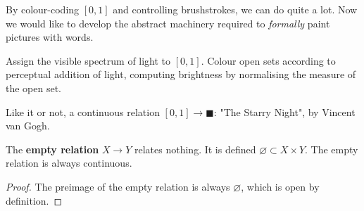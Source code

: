 By colour-coding $[0,1]$ and controlling brushstrokes, we can do quite a lot. Now we would like to develop the abstract machinery required to \emph{formally} paint pictures with words.

\begin{marginfigure}
\centering
{}
\caption{Assign the visible spectrum of light to $[0,1]$. Colour open sets according to perceptual addition of light, computing brightness by normalising the measure of the open set.}
\end{marginfigure}

\begin{marginfigure}
\centering
{}
\caption{Like it or not, a continuous relation $[0,1] \rightarrow \blacksquare$: "The Starry Night", by Vincent van Gogh.}
\end{marginfigure}


\begin{proposition}
The \textbf{empty relation} $X \rightarrow Y$ relates nothing. It is defined $\varnothing \subset X \times Y$. The empty relation is always continuous.
\label{prop:emptyrel}
\begin{proof}
The preimage of the empty relation is always $\varnothing$, which is open by definition.
\end{proof}
\end{proposition}

